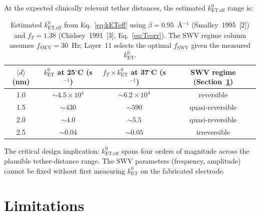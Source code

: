 \documentclass[10pt,a4paper]{article}
\numberwithin{equation}{section}
\newcommand{\kET}{k_{\text{ET}}^{0}}
\newcommand{\cit}[1]{[#1]}
\begin{document}
At the expected clinically relevant tether distances, the estimated
$k^{0}_{\text{ET,eff}}$ range is:

\begin{table}[H]
\centering
\small\renewcommand{\arraystretch}{1.3}
\begin{tabular}{@{}cccc@{}}
\toprule
$\langle d\rangle$ (nm) & $\kET$ at 25$^\circ$C (s$^{-1}$) &
$f_T \times \kET$ at 37$^\circ$C (s$^{-1}$) & SWV regime (Section~\ref{sec:limits}) \\
\midrule
1.0 & $\sim 4.5\times10^4$ & $\sim 6.2\times10^4$ & reversible \\
1.5 & $\sim 430$           & $\sim 590$            & quasi-reversible \\
2.0 & $\sim 4.0$           & $\sim 5.5$            & quasi-reversible \\
2.5 & $\sim 0.04$          & $\sim 0.05$           & irreversible \\
\bottomrule
\end{tabular}
\caption{Estimated $k^{0}_{\text{ET,eff}}$ from Eq.~\eqref{eq:kETeff} using
$\beta = 0.95$~\AA$^{-1}$ (Smalley~1995~\cit{2}) and $f_T = 1.38$
(Chidsey~1991~\cit{3}, Eq.~\ref{eq:Tcorr}). The SWV regime column
assumes $f_{\text{SWV}} = 30$~Hz; Layer~11 selects the optimal
$f_{\text{SWV}}$ given the measured $\kET$.}
\label{tab:kETeff}
\end{table}

The critical design implication: $k^{0}_{\text{ET,eff}}$ spans four orders
of magnitude across the plausible tether-distance range. The SWV
parameters (frequency, amplitude) cannot be fixed without first
measuring $\kET$ on the fabricated electrode.

\section{Limitations}
\label{sec:limits}
\end{document}
